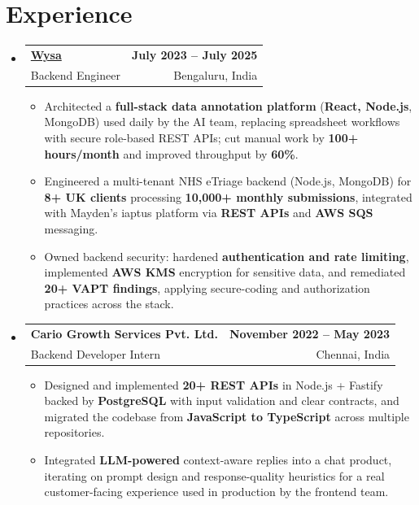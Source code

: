 \documentclass[letterpaper,10pt]{article}
\makeatletter
\newcommand{\resumeItem}[1]{
  \item\small{#1\vspace{-1pt}}
}
\newcommand{\resumeSubheading}[4]{
  \vspace{1pt}\item
    \begin{tabular*}{0.985\textwidth}[t]{l@{\extracolsep{\fill}}r}
      \textbf{#1} & \textbf{\small #2} \\
      {\small\color{ResumeSlate} #3} & {\small\color{ResumeSlate} #4} \\
    \end{tabular*}\vspace{-6pt}
}
\newcommand{\resumeSubHeadingListStart}{\begin{itemize}[leftmargin=0.0in, label={}, itemsep=2pt, topsep=2pt]}
\newcommand{\resumeSubHeadingListEnd}{\end{itemize}}
\newcommand{\resumeItemListStart}{\begin{itemize}[leftmargin=0.18in, itemsep=2pt, topsep=1pt]}
\newcommand{\resumeItemListEnd}{\end{itemize}\vspace{-4pt}}
\makeatother
\begin{document}
\section{Experience}
\resumeSubHeadingListStart
  \resumeSubheading
    {\href{https://www.wysa.io}{Wysa}}{July 2023 -- July 2025}
    {Backend Engineer}{Bengaluru, India}
    \resumeItemListStart
      \resumeItem{Architected a \textbf{full-stack data annotation platform} (\textbf{React, Node.js}, MongoDB) used daily by the AI team, replacing spreadsheet workflows with secure role-based REST APIs; cut manual work by \textbf{100+ hours/month} and improved throughput by \textbf{60\%}.}
      \resumeItem{Engineered a multi-tenant NHS eTriage backend (Node.js, MongoDB) for \textbf{8+ UK clients} processing \textbf{10{,}000+ monthly submissions}, integrated with Mayden's iaptus platform via \textbf{REST APIs} and \textbf{AWS SQS} messaging.}
      \resumeItem{Owned backend security: hardened \textbf{authentication and rate limiting}, implemented \textbf{AWS KMS} encryption for sensitive data, and remediated \textbf{20+ VAPT findings}, applying secure-coding and authorization practices across the stack.}
    \resumeItemListEnd
  \resumeSubheading
    {Cario Growth Services Pvt. Ltd.}{November 2022 -- May 2023}
    {Backend Developer Intern}{Chennai, India}
    \resumeItemListStart
      \resumeItem{Designed and implemented \textbf{20+ REST APIs} in Node.js + Fastify backed by \textbf{PostgreSQL} with input validation and clear contracts, and migrated the codebase from \textbf{JavaScript to TypeScript} across multiple repositories.}
      \resumeItem{Integrated \textbf{LLM-powered} context-aware replies into a chat product, iterating on prompt design and response-quality heuristics for a real customer-facing experience used in production by the frontend team.}
    \resumeItemListEnd
\resumeSubHeadingListEnd
\vspace{-4pt}
\end{document}
